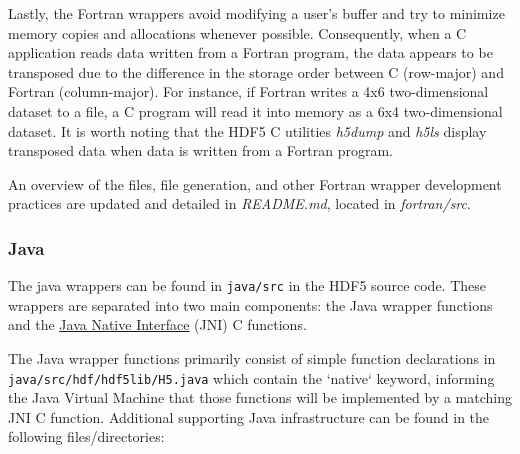 Lastly, the Fortran wrappers avoid modifying a user's buffer and try to minimize memory copies and allocations whenever possible. Consequently, when a C application reads data written from a Fortran program, the data appears to be transposed due to the difference in the storage order between C (row-major) and Fortran (column-major). For instance, if Fortran writes a 4x6 two-dimensional dataset to a file, a C program will read it into memory as a 6x4 two-dimensional dataset. It is worth noting that the HDF5 C utilities \textit{h5dump} and \textit{h5ls} display transposed data when data is written from a Fortran program.

An overview of the files, file generation, and other Fortran wrapper development practices are updated and detailed in \textit{README.md}, located in \textit{fortran/src}.

\subsubsection{Java\label{subsec:Java}}

The java wrappers can be found in \texttt{java/src} in the HDF5 source code. These wrappers
are separated into two main components: the Java wrapper functions and the
\href{https://docs.oracle.com/en/java/javase/17/docs/specs/jni/index.html}{Java Native Interface}
(JNI) C functions.

The Java wrapper functions primarily consist of simple function declarations in \\
\texttt{java/src/hdf/hdf5lib/H5.java} which contain the `native` keyword, informing the Java
Virtual Machine that those functions will be implemented by a matching JNI C function.
Additional supporting Java infrastructure can be found in the following files/directories:

